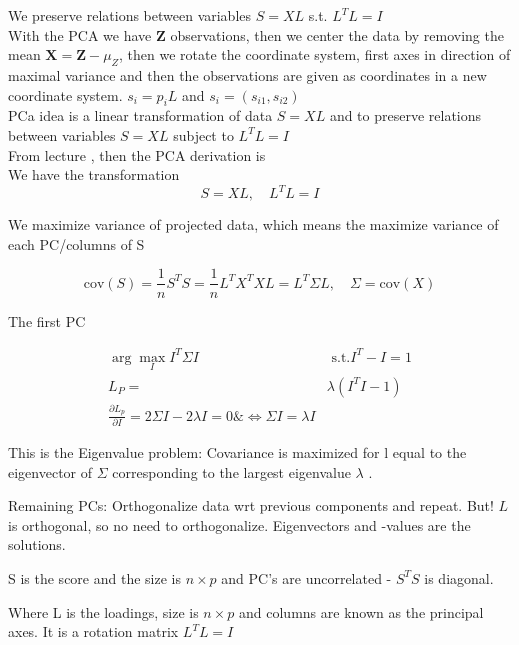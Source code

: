 We preserve relations between variables $S = XL$ s.t. $L^T L = I$\\

With the PCA we have $\bm{Z}$ observations, then we center the data by removing the mean $\bm{X} = \bm{Z} - \mu_Z$, then we rotate the coordinate system, first axes in direction of maximal variance and then the observations are given as coordinates in a new coordinate system. $s_i = p_i L$ and $s_i = (s_{i1} , s_{i2})$\\

PCa idea is a linear transformation of data $S = XL$ and to preserve relations between variables $S = XL$ subject to $L^T L = I$\\

From lecture \cite[p.~15-20]{lecture6}, then the PCA derivation is\\

We have the transformation
\[
    S = XL, \quad L^TL = I
\]

We maximize variance of projected data, which means the maximize variance of each PC/columns of S

\[
    \text{cov}(S) = \frac{1}{n} S^T S = \frac{1}{n} L^T X^T XL = L^T \Sigma L, \quad \Sigma = \text{cov}(X)
\]

The first PC

\begin{equation}
  \begin{split}
     \arg \max\limits_I I^T \Sigma I & \text{ s.t.} I^T - I = 1 \\
     L_P =  & \lambda(I^T I - 1) \\
     \frac{\partial L_p}{\partial I}  = 2 \Sigma I - 2 \lambda I = 0 \& \Leftrightarrow \Sigma I = \lambda I
  \end{split}
\end{equation}

This is the Eigenvalue problem: Covariance is maximized for l equal to the eigenvector of $\Sigma$ corresponding to the largest eigenvalue $\lambda$ .

Remaining PCs: Orthogonalize data wrt previous components and
repeat. But! $L$ is orthogonal, so no need to orthogonalize. Eigenvectors and -values are the solutions.

S is the score and the size is $n \times p$ and PC's are uncorrelated - $S^T S $ is diagonal.

Where L is the loadings, size is $n \times p$ and columns are known as the principal axes. It is a rotation matrix $L^T L = I$

